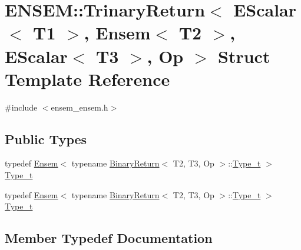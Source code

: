 \hypertarget{structENSEM_1_1TrinaryReturn_3_01EScalar_3_01T1_01_4_00_01Ensem_3_01T2_01_4_00_01EScalar_3_01T3_01_4_00_01Op_01_4}{}\section{E\+N\+S\+EM\+:\+:Trinary\+Return$<$ E\+Scalar$<$ T1 $>$, Ensem$<$ T2 $>$, E\+Scalar$<$ T3 $>$, Op $>$ Struct Template Reference}
\label{structENSEM_1_1TrinaryReturn_3_01EScalar_3_01T1_01_4_00_01Ensem_3_01T2_01_4_00_01EScalar_3_01T3_01_4_00_01Op_01_4}


{\ttfamily \#include $<$ensem\+\_\+ensem.\+h$>$}

\subsection*{Public Types}
\begin{DoxyCompactItemize}
\item 
typedef \mbox{\hyperlink{classENSEM_1_1Ensem}{Ensem}}$<$ typename \mbox{\hyperlink{structENSEM_1_1BinaryReturn}{Binary\+Return}}$<$ T2, T3, Op $>$\+::\mbox{\hyperlink{structENSEM_1_1TrinaryReturn_3_01EScalar_3_01T1_01_4_00_01Ensem_3_01T2_01_4_00_01EScalar_3_01T3_01_4_00_01Op_01_4_a98ef67a0030ae73c26e820e20e622f06}{Type\+\_\+t}} $>$ \mbox{\hyperlink{structENSEM_1_1TrinaryReturn_3_01EScalar_3_01T1_01_4_00_01Ensem_3_01T2_01_4_00_01EScalar_3_01T3_01_4_00_01Op_01_4_a98ef67a0030ae73c26e820e20e622f06}{Type\+\_\+t}}
\item 
typedef \mbox{\hyperlink{classENSEM_1_1Ensem}{Ensem}}$<$ typename \mbox{\hyperlink{structENSEM_1_1BinaryReturn}{Binary\+Return}}$<$ T2, T3, Op $>$\+::\mbox{\hyperlink{structENSEM_1_1TrinaryReturn_3_01EScalar_3_01T1_01_4_00_01Ensem_3_01T2_01_4_00_01EScalar_3_01T3_01_4_00_01Op_01_4_a98ef67a0030ae73c26e820e20e622f06}{Type\+\_\+t}} $>$ \mbox{\hyperlink{structENSEM_1_1TrinaryReturn_3_01EScalar_3_01T1_01_4_00_01Ensem_3_01T2_01_4_00_01EScalar_3_01T3_01_4_00_01Op_01_4_a98ef67a0030ae73c26e820e20e622f06}{Type\+\_\+t}}
\end{DoxyCompactItemize}


\subsection{Member Typedef Documentation}
\mbox{\label{structENSEM_1_1TrinaryReturn_3_01EScalar_3_01T1_01_4_00_01Ensem_3_01T2_01_4_00_01EScalar_3_01T3_01_4_00_01Op_01_4_a98ef67a0030ae73c26e820e20e622f06}} 
